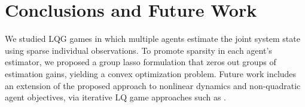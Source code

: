 \documentclass[letterpaper, 10 pt, conference]{ieeeconf}  %
\begin{document}
\section{Conclusions and Future Work}
\label{sec:conclusion}

We studied LQG games in which multiple agents estimate the joint system state using sparse individual observations. To promote sparsity in each agent’s estimator, we proposed a group lasso formulation that zeros out groups of estimation gains, yielding a convex optimization problem.  Future work includes an extension of the proposed approach to nonlinear dynamics and non-quadratic agent objectives, via iterative LQ game approaches such as \cite{fridovich2020efficient,wang2020game,schwarting2021stochastic}.











\end{document}
